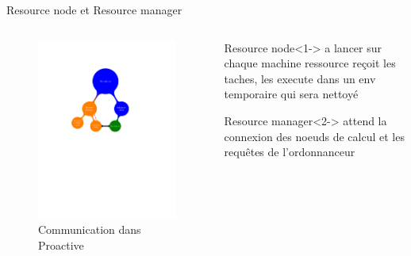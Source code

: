 \documentclass{beamer}
\begin{document}
\begin{frame}{Resource node et Resource manager}
	\begin{columns}
	\begin{column}[l]{0.5\linewidth}
        \begin{figure}
            \centering
            \includegraphics[trim=4cm 13cm 2cm 5cm,scale=0.48]{node_declaration.pdf}
            \caption{Communication dans Proactive}
        \end{figure}
	\end{column}
	\begin{column}[r]{0.5\linewidth}
        
        \begin{block}{Resource node}<1->
             a lancer sur chaque machine ressource
             reçoit les taches, les execute dans un env temporaire qui sera nettoyé
        \end{block}
        \begin{block}{Resource manager}<2->
             attend la connexion des noeuds de calcul et les requêtes de l'ordonnanceur
        \end{block}
	\end{column}
	\end{columns}
\end{frame}
\end{document}
